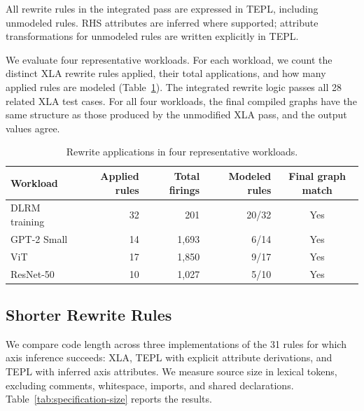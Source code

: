 All rewrite rules in the integrated pass are expressed in TEPL,
including unmodeled rules. RHS attributes are inferred where supported;
attribute transformations for unmodeled rules are written explicitly
in TEPL.

We evaluate four representative workloads. For each workload, we count
the distinct XLA rewrite rules applied, their total applications,
and how many applied rules are modeled
(Table~\ref{tab:algebraic-simplifier-workloads}).
The integrated rewrite logic passes all 28 related XLA test cases.
For all four workloads, the final compiled graphs have the same
structure as those produced by the unmodified XLA pass, and the
output values agree.

\begin{table}[!htbp]
\caption{Rewrite applications in four representative workloads.}
\label{tab:algebraic-simplifier-workloads}
\small
\begin{tabular*}{\linewidth}{@{\extracolsep{\fill}}lrrrc@{}}\toprule
Workload & Applied rules & Total firings & Modeled rules & Final graph match\\\midrule
DLRM training & 32 & 201 & 20/32 & Yes\\
GPT-2 Small & 14 & 1,693 & 6/14 & Yes\\
ViT & 17 & 1,850 & 9/17 & Yes\\
ResNet-50 & 10 & 1,027 & 5/10 & Yes\\\bottomrule
\end{tabular*}
\end{table}

\subsection{Shorter Rewrite Rules}
\label{sec:shorter-rewrite-rules}
We compare code length across three implementations of the 31 rules
for which axis inference succeeds: XLA, TEPL with explicit attribute
derivations, and TEPL with inferred axis attributes.
We measure source size in lexical tokens, excluding comments,
whitespace, imports, and shared declarations.
Table~\ref{tab:specification-size} reports the results.

